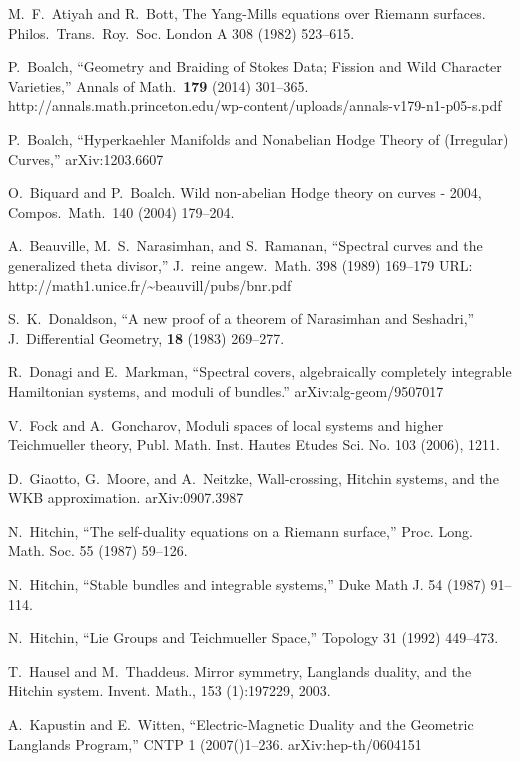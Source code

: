 \documentclass[oneside,english]{amsbook}
\numberwithin{section}{chapter}
\numberwithin{equation}{section}
\numberwithin{figure}{section}
\theoremstyle{plain}
\theoremstyle{definition}
\theoremstyle{remark}
\theoremstyle{definition}
\theoremstyle{definition}
\theoremstyle{plain}
\theoremstyle{plain}
\begin{document}
\begin{thebibliography}{AB}
M.~F.~Atiyah and R.~Bott, The Yang-Mills equations
over Riemann surfaces. Philos.~Trans.~Roy.~Soc. London A 308 (1982)
523--615.

P.~Boalch, ``Geometry and Braiding of Stokes Data;
Fission and Wild Character Varieties,'' Annals of Math.~\textbf{179}
(2014) 301--365. http://annals.math.princeton.edu/wp-content/uploads/annals-v179-n1-p05-s.pdf

P.~Boalch, ``Hyperkaehler Manifolds and Nonabelian
Hodge Theory of (Irregular) Curves,'' arXiv:1203.6607

O.~Biquard and P.~Boalch. Wild non-abelian Hodge
theory on curves - 2004, Compos.~Math.~140 (2004) 179--204.

A.~Beauville, M.~S.~Narasimhan, and S.~Ramanan,
``Spectral curves and the generalized theta divisor,'' J.~reine
angew.~Math. 398 (1989) 169--179 URL: http://math1.unice.fr/\textasciitilde{}beauvill/pubs/bnr.pdf

S.~K.~Donaldson, ``A new proof of a theorem of Narasimhan
and Seshadri,'' J.~Differential Geometry, \textbf{18} (1983) 269--277.

R.~Donagi and E.~Markman, ``Spectral covers, algebraically
completely integrable Hamiltonian systems, and moduli of bundles.''
arXiv:alg-geom/9507017

V.~Fock and A.~Goncharov, Moduli spaces of local
systems and higher Teichmueller theory, Publ. Math. Inst. Hautes Etudes
Sci. No. 103 (2006), 1\textendash{}211.

 D.~Giaotto, G.~Moore, and A.~Neitzke, Wall-crossing,
Hitchin systems, and the WKB approximation. arXiv:0907.3987

N.~Hitchin, ``The self-duality equations on a Riemann
surface,'' Proc. Long. Math. Soc. 55 (1987) 59--126.

N.~Hitchin, ``Stable bundles and integrable systems,''
Duke Math J. 54 (1987) 91--114.

N.~Hitchin, ``Lie Groups and Teichmueller Space,''
Topology 31 (1992) 449--473.

T.~Hausel and M.~Thaddeus. Mirror symmetry, Langlands
duality, and the Hitchin system. Invent. Math., 153 (1):197\textendash{}229,
2003.

A.~Kapustin and E.~Witten, ``Electric-Magnetic
Duality and the Geometric Langlands Program,'' CNTP 1 (2007()1--236.
arXiv:hep-th/0604151


\end{thebibliography}
\end{document}
